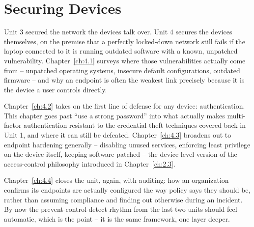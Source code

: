 \part{Securing Devices}

Unit 3 secured the network the devices talk over. Unit 4 secures the devices themselves, on the
premise that a perfectly locked-down network still fails if the laptop connected to it is running
outdated software with a known, unpatched vulnerability. Chapter~\ref{ch:4.1} surveys where those
vulnerabilities actually come from -- unpatched operating systems, insecure default
configurations, outdated firmware -- and why an endpoint is often the weakest link precisely
because it is the device a user controls directly.

Chapter~\ref{ch:4.2} takes on the first line of defense for any device: authentication. This
chapter goes past ``use a strong password'' into what actually makes multi-factor authentication
resistant to the credential-theft techniques covered back in Unit 1, and where it can still be
defeated. Chapter~\ref{ch:4.3} broadens out to endpoint hardening generally -- disabling unused
services, enforcing least privilege on the device itself, keeping software patched -- the
device-level version of the access-control philosophy introduced in Chapter~\ref{ch:2.3}.

Chapter~\ref{ch:4.4} closes the unit, again, with auditing: how an organization confirms its
endpoints are actually configured the way policy says they should be, rather than assuming
compliance and finding out otherwise during an incident. By now the prevent-control-detect
rhythm from the last two units should feel automatic, which is the point -- it is the same
framework, one layer deeper.
